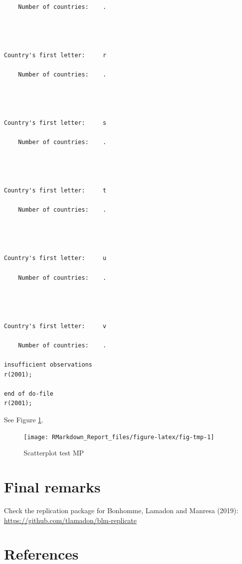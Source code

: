\documentclass[
  12pt,
]{article}
\begin{document}
\begin{verbatim}
    Number of countries:    .




Country's first letter:     r

    Number of countries:    .




Country's first letter:     s

    Number of countries:    .




Country's first letter:     t

    Number of countries:    .




Country's first letter:     u

    Number of countries:    .




Country's first letter:     v

    Number of countries:    .

insufficient observations
r(2001);

end of do-file
r(2001);
\end{verbatim}

See Figure \ref{fig:fig-tmp}.

\begin{figure}[ht]

{\centering \texttt{[image: RMarkdown\_Report\_files/figure-latex/fig-tmp-1]} 

}

\caption{Scatterplot test MP}\label{fig:fig-tmp}
\end{figure}

\hypertarget{final-remarks}{%
\section{Final remarks}\label{final-remarks}}

Check the replication package for Bonhomme, Lamadon and Manresa (2019): \url{https://github.com/tlamadon/blm-replicate}

\newpage

\hypertarget{references}{%
\section*{References}\label{references}}
\end{document}
